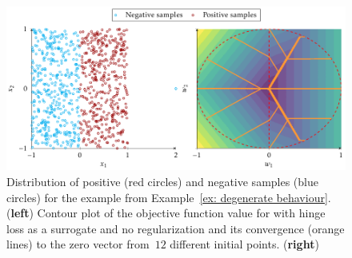 \begin{figure}
  \centering
  \includegraphics[width=\linewidth]{images/toppush_convergence.pdf}
  \caption{Distribution of positive (red circles) and negative samples (blue circles) for the example from Example~\ref{ex: degenerate behaviour}. (\textbf{left}) Contour plot of the objective function value for \TopPush with hinge loss as a surrogate and no regularization and its convergence (orange lines) to the zero vector from~$12$ different initial points. (\textbf{right})}
  \label{fig: degenerate behaviour}
\end{figure}

